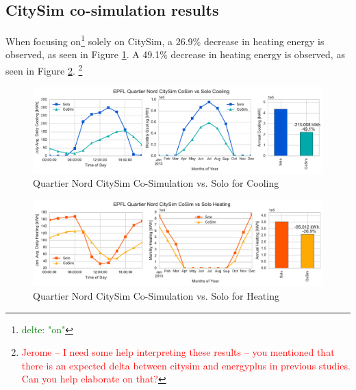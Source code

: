 \documentclass{tBPS2e}
\theoremstyle{plain}
\theoremstyle{definition}
\theoremstyle{remark}
\newcommand{\noteCM}[1]{\footnote{\textcolor{red}{#1}}}
\newcommand{\noteDT}[1]{\footnote{\textcolor{green}{#1}}}
\begin{document}
\subsection{CitySim co-simulation results}

When focusing on\noteDT{delte: "on"} solely on CitySim, a 26.9\% decrease in heating energy is observed, as seen in Figure \ref{fig:qn_citysim_cosimvssolo_cooling}. A 49.1\% decrease in heating energy is observed, as seen in Figure \ref{fig:qn_citysim_cosimvssolo_heating}. \noteCM{Jerome -- I need some help interpreting these results -- you mentioned that there is an expected delta between citysim and energyplus in previous studies. Can you help elaborate on that?}

\begin{figure}[H]
\centering
\includegraphics[scale=0.55]{figures/QN_CitySim_Cooling}
\caption{Quartier Nord CitySim Co-Simulation vs. Solo for Cooling}
\label{fig:qn_citysim_cosimvssolo_cooling}
\end{figure}

\begin{figure}[H]
\centering
\includegraphics[scale=0.55]{figures/QN_CitySim_Heating}
\caption{Quartier Nord CitySim Co-Simulation vs. Solo for Heating}
\label{fig:qn_citysim_cosimvssolo_heating}
\end{figure}
\end{document}
